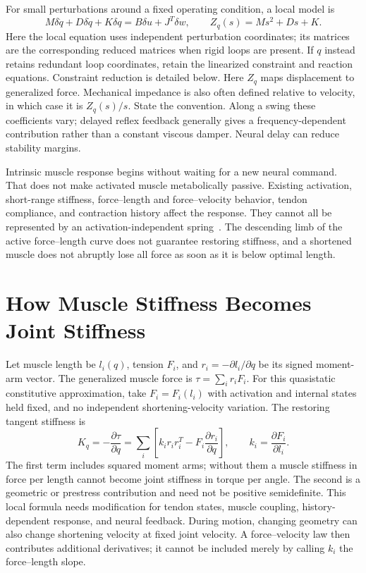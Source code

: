 For small perturbations around a fixed operating condition, a local model is
\begin{equation}
M\delta\ddot q+D\delta\dot q+K\delta q=B\delta u+J^T\delta w,
\qquad Z_q(s)=Ms^2+Ds+K.
\label{eq:impedance_control}
\end{equation}
Here the local equation uses independent perturbation coordinates; its
matrices are the corresponding reduced matrices when rigid loops are present.
If $q$ instead retains redundant loop coordinates, retain the linearized
constraint and reaction equations. Constraint reduction is detailed below.
Here $Z_q$ maps displacement to generalized force. Mechanical impedance is
also often defined relative to velocity, in which case it is $Z_q(s)/s$.
State the convention. Along a swing these coefficients vary; delayed reflex
feedback generally gives a frequency-dependent contribution rather than a
constant viscous damper. Neural delay can reduce stability margins.

Intrinsic muscle response begins without waiting for a new neural command.
That does not make activated muscle metabolically passive. Existing activation,
short-range stiffness, force--length and force--velocity behavior, tendon
compliance, and contraction history affect the response. They cannot all be
represented by an activation-independent spring~\cite{rack1974short}.
The descending limb of the active force--length curve does not guarantee
restoring stiffness, and a shortened muscle does not abruptly lose all force
as soon as it is below optimal length.

\section{How Muscle Stiffness Becomes Joint Stiffness}
\label{sec:pretensioning}

Let muscle length be $l_i(q)$, tension $F_i$, and
$r_i=-\partial l_i/\partial q$ be its signed moment-arm vector. The generalized
muscle force is $\tau=\sum_i r_iF_i$. For this quasistatic constitutive
approximation, take $F_i=F_i(l_i)$ with activation and internal states held
fixed, and no independent shortening-velocity variation. The restoring
tangent stiffness is
\begin{equation}
K_q=-\frac{\partial\tau}{\partial q}
=\sum_i\left[k_i r_i r_i^T-F_i\frac{\partial r_i}{\partial q}\right],
\qquad k_i=\frac{\partial F_i}{\partial l_i}.
\label{eq:cocontraction_stiffness}
\end{equation}
The first term includes squared moment arms; without them a muscle stiffness
in force per length cannot become joint stiffness in torque per angle. The
second is a geometric or prestress contribution and need not be positive semidefinite.
This local formula needs modification for tendon states, muscle coupling,
history-dependent response, and neural feedback. During motion, changing
geometry can also change shortening velocity at fixed joint velocity. A
force--velocity law then contributes additional derivatives; it cannot be
included merely by calling $k_i$ the force--length slope.

